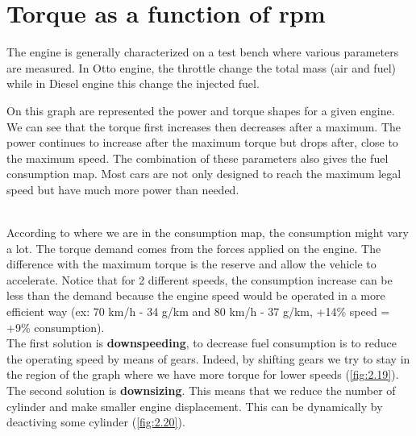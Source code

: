 	
\section{Torque as a function of rpm}
	The engine is generally characterized on a test bench where various parameters are measured. In Otto engine, the throttle change the total mass (air and fuel) while in Diesel engine this change the injected fuel. 
	
	On this graph are represented the power and torque shapes for a given engine. We can see that the torque first increases then decreases after a maximum. The power continues to increase after the maximum torque but drops after, close to the maximum speed. The combination of these parameters also gives the fuel consumption map. Most cars are not only designed to reach the maximum legal speed but have much more power than needed. 
	
	\ \\
	
	According to where we are in the consumption map, the consumption might vary a lot. The torque demand comes from the forces applied on the engine. The difference with the maximum torque is the reserve and allow the vehicle to accelerate. Notice that for 2 different speeds, the consumption increase can be less than the demand because the engine speed would be operated in a more efficient way (ex: 70 km/h - 34 g/km and 80 km/h - 37 g/km, +14\% speed =  +9\% consumption). \\
	The first solution is \textbf{downspeeding}, to decrease fuel consumption is to reduce the operating speed by means of gears. Indeed, by shifting gears we try to stay in the region of the graph where we have more torque for lower speeds (\autoref{fig:2.19}). The second solution is \textbf{downsizing}. This means that we reduce the number of cylinder and make smaller engine displacement. This can be dynamically by deactiving some cylinder (\autoref{fig:2.20}). 
	
